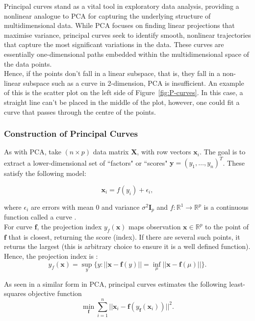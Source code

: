 \documentclass{article}\usepackage[]{graphicx}\usepackage[]{xcolor}
\numberwithin{equation}{section}
\begin{document}
\noindent Principal curves stand as a vital tool in exploratory data analysis, providing a nonlinear analogue to PCA for capturing the underlying structure of multidimensional data. While PCA focuses on finding linear projections that maximise variance, principal curves seek to identify smooth, nonlinear trajectories that capture the most significant variations in the data. These curves are essentially one-dimensional paths embedded within the multidimensional space of the data points.\\

\noindent Hence, if the points don't fall in a linear subspace, that is, they fall in a non-linear subspace such as a curve in 2-dimension, PCA is insufficient. An example of this is the scatter plot on the left side of Figure~\ref{fig:P-curves}. In this case, a straight line can't be placed in the middle of the plot, however, one could fit a curve that passes through the centre of the points.

\subsubsection{Construction of Principal Curves}

\noindent As with PCA, take $(n \times p)$ data matrix $\mathbf{X}$, with row vectors $\mathbf{x}_i$. The goal is to extract a lower-dimensional set of ``factors" or ``scores" $\mathbf{y} = (y_1, \dots, y_n)^T$. These satisfy the following model:

\[
\mathbf{x}_i = f(y_i) + \epsilon_i, 
\]

\noindent where $\epsilon_i$ are errors with mean 0 and variance $\sigma^2 \mathbf{I}_p$ and $f: \mathbb{R}^1 \rightarrow \mathbb{R}^p$ is a continuous function called a curve \cite{jolliffe2003principal}.\\

\noindent For curve $\mathbf{f}$, the projection index $y_f(\mathbf{x})$ maps observation $\mathbf{x} \in \mathbb{R}^p$ to the point of $\mathbf{f}$ that is closest, returning the score (index). If there are several such points, it returns the largest (this is arbitrary choice to ensure it is a well defined function). Hence, the projection index is \cite{jolliffe2003principal}: 
\[
y_f(\mathbf{x}) = \sup\limits_{y}\{y: ||\mathbf{x}-\mathbf{f}(y)||= \inf\limits_{\mu}||\mathbf{x}-\mathbf{f}(\mu)||\}.
\]

\noindent As seen in a similar form in PCA, principal curves estimates the following least-squares objective function
\[
\min\limits_{\mathbf{f}}\sum_{i=1}^{n} ||\mathbf{x}_i - \mathbf{f}(y_{\mathbf{f}}(\mathbf{x}_i))||^2.
\]
\end{document}
